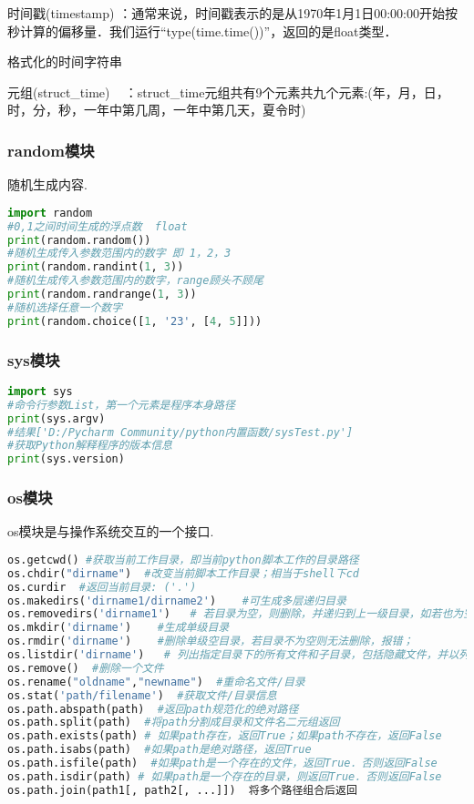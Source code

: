 时间戳(timestamp) ：通常来说，时间戳表示的是从1970年1月1日00:00:00开始按秒计算的偏移量．我们运行“type(time.time())”，返回的是float类型．

格式化的时间字符串

元组(struct_time)   ：struct_time元组共有9个元素共九个元素:(年，月，日，时，分，秒，一年中第几周，一年中第几天，夏令时)

\subsubsection{random模块}
随机生成内容.
\begin{lstlisting}[language=python]
import random
#0,1之间时间生成的浮点数  float
print(random.random())
#随机生成传入参数范围内的数字 即 1，2，3
print(random.randint(1, 3))
#随机生成传入参数范围内的数字，range顾头不顾尾
print(random.randrange(1, 3))
#随机选择任意一个数字
print(random.choice([1, '23', [4, 5]]))
\end{lstlisting}

\subsubsection{sys模块}
\begin{lstlisting}[language=python]
import sys
#命令行参数List，第一个元素是程序本身路径
print(sys.argv)
#结果['D:/Pycharm Community/python内置函数/sysTest.py']
#获取Python解释程序的版本信息
print(sys.version)
\end{lstlisting}

\subsubsection{os模块}
os模块是与操作系统交互的一个接口.
\begin{lstlisting}[language=python]
os.getcwd() #获取当前工作目录，即当前python脚本工作的目录路径
os.chdir("dirname")  #改变当前脚本工作目录；相当于shell下cd
os.curdir  #返回当前目录: ('.')
os.makedirs('dirname1/dirname2')    #可生成多层递归目录
os.removedirs('dirname1')   # 若目录为空，则删除，并递归到上一级目录，如若也为空，则删除，依此类推
os.mkdir('dirname')    #生成单级目录
os.rmdir('dirname')    #删除单级空目录，若目录不为空则无法删除，报错；
os.listdir('dirname')   # 列出指定目录下的所有文件和子目录，包括隐藏文件，并以列表方式打印
os.remove()  #删除一个文件
os.rename("oldname","newname")  #重命名文件/目录
os.stat('path/filename')  #获取文件/目录信息
os.path.abspath(path)  #返回path规范化的绝对路径
os.path.split(path)  #将path分割成目录和文件名二元组返回
os.path.exists(path) # 如果path存在，返回True；如果path不存在，返回False
os.path.isabs(path)  #如果path是绝对路径，返回True
os.path.isfile(path)  #如果path是一个存在的文件，返回True．否则返回False
os.path.isdir(path) # 如果path是一个存在的目录，则返回True．否则返回False
os.path.join(path1[, path2[, ...]])  将多个路径组合后返回
\end{lstlisting}



